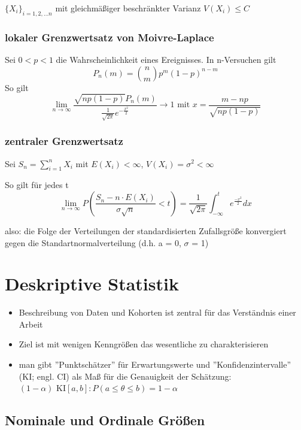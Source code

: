 \documentclass[10pt]{report}
\theoremstyle{definition}
\begin{document}
$\{X_i\}_{i=1,2, \ldots n}$ mit gleichmäßiger beschränkter Varianz  $V(X_i) \leq C$


\subsection{lokaler Grenzwertsatz von Moivre-Laplace}
Sei $0<p<1$ die Wahrscheinlichkeit eines Ereignisses.
In n-Versuchen gilt
\[P_n (m) = \binom{n}{m} p^m(1-p)^{n-m}\] So gilt \[\lim\limits_{n \to \infty} \frac{\sqrt{np(1-p)} P_n(m)}{\frac{1}{\sqrt{2 \pi}} e ^{-\frac{x^2}{2}}} \rightarrow  1 \text{ mit } x=\frac{m-np}{\sqrt{np(1-p)}}\]

\subsection{zentraler Grenzwertsatz}

Sei $S_n =  \sum_{i=1}^{n} X_i$ mit $E(X_i)<\infty$, $V(X_i) = \sigma ^2 < \infty$

So gilt für jedes t
\[ \lim\limits_{n \rightarrow \infty} P \left(\frac{S_n - n \cdot E(X_i)}{\sigma \sqrt{n} }< t\right) = \frac{1}{\sqrt{2\pi} }\int_{-\infty}^{t} e^{\frac{-x^2}{2}} dx
\]

also: die Folge der Verteilungen der standardisierten Zufallsgröße konvergiert gegen die Standartnormalverteilung (d.h. a = 0, $\sigma$ = 1)


\chapter{Deskriptive Statistik}

\begin{itemize}
	\item Beschreibung von Daten und Kohorten ist zentral für das Verständnis einer Arbeit
	\item Ziel ist mit wenigen Kenngrößen das wesentliche zu charakterisieren 
	\item man gibt ''Punktschätzer''  für Erwartungswerte und ''Konfidenzintervalle'' (KI; engl. CI) als Maß für die Genauigkeit der Schätzung:\\
	$(1- \alpha) \text{ KI} [a,b] : P(a \leq \theta \leq b) = 1-\alpha$
\end{itemize}


\section{Nominale und Ordinale Größen}
\end{document}
